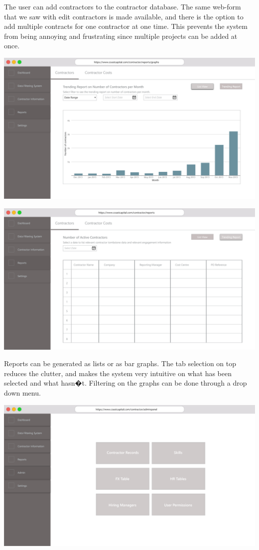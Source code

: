 \documentclass[11pt, titlepage]{article}
\begin{document}
The user can add contractors to the contractor database. The same web-form that we saw with edit contractors is made available, and there is the option to add multiple contracts for one contractor at one time. This prevents the system from being annoying and frustrating since multiple projects can be added at once. 

\includegraphics[width=1.0\textwidth]{../design/Report}

\includegraphics[width=1.0\textwidth]{../design/Report1}

Reports can be generated as lists or as bar graphs. The tab selection on top reduces the clutter, and makes the system very intuitive on what has been selected and what hasn�t. Filtering on the graphs can be done through a drop down menu.

\includegraphics[width=1.0\textwidth]{"../design/Admin Dashboard"}
\end{document}
